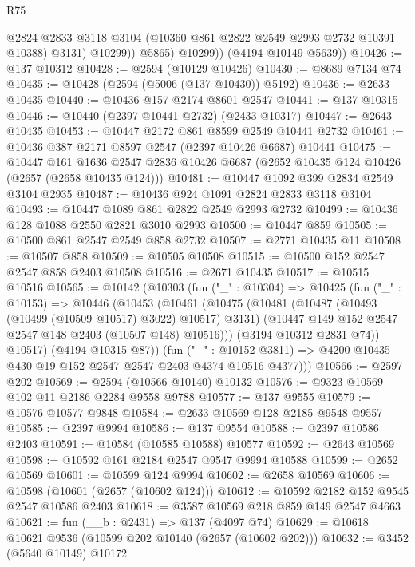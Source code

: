 \begin{lexlean}{R75}
\begin{coremodule}
                  @2824
                  @2833
                  @3118
                  @3104
                  (@10360 @861 @2822 @2549 @2993 @2732 @10391 @10388)
                  @3131)
                @10299))
            @5865)
          @10299))
      (@4194 @10149 @5639))
@10426 := @137 @10312
@10428 := @2594 (@10129 @10426)
@10430 := @8689 @7134 @74
@10435 := @10428 (@2594 (@5006 (@137 @10430)) @5192)
@10436 := @2633 @10435
@10440 := @10436 @157 @2174 @8601 @2547
@10441 := @137 @10315
@10446 := @10440 (@2397 @10441 @2732) (@2433 @10317)
@10447 := @2643 @10435
@10453 := @10447 @2172 @861 @8599 @2549 @10441 @2732
@10461 := @10436 @387 @2171 @8597 @2547 (@2397 @10426 @6687) @10441
@10475 := @10447
    @161
    @1636
    @2547
    @2836
    @10426
    @6687
    (@2652 @10435 @124 @10426 (@2657 (@2658 @10435 @124)))
@10481 := @10447 @1092 @399 @2834 @2549 @3104 @2935
@10487 := @10436 @924 @1091 @2824 @2833 @3118 @3104
@10493 := @10447 @1089 @861 @2822 @2549 @2993 @2732
@10499 := @10436 @128 @1088 @2550 @2821 @3010 @2993
@10500 := @10447 @859
@10505 := @10500 @861 @2547 @2549 @858 @2732
@10507 := @2771 @10435 @11
@10508 := @10507 @858
@10509 := @10505 @10508
@10515 := @10500 @152 @2547 @2547 @858 @2403 @10508
@10516 := @2671 @10435
@10517 := @10515 @10516
@10565 := @10142
    (@10303
      (fun ("_" : @10304) =>
      @10425
        (fun ("_" : @10153) =>
        @10446
          (@10453
            (@10461
              (@10475
                (@10481
                  (@10487 (@10493 (@10499 (@10509 @10517) @3022) @10517) @3131)
                  (@10447 @149 @152 @2547 @2547 @148 @2403 (@10507 @148) @10516)))
              (@3194 @10312 @2831 @74))
            @10517)
          (@4194 @10315 @87))
        (fun ("_" : @10152 @3811) =>
        @4200 @10435 @430 @19 @152 @2547 @2547 @2403 @4374 @10516 @4377)))
@10566 := @2597 @202
@10569 := @2594 (@10566 @10140) @10132
@10576 := @9323 @10569 @102 @11 @2186 @2284 @9558 @9788
@10577 := @137 @9555
@10579 := @10576 @10577 @9848
@10584 := @2633 @10569 @128 @2185 @9548 @9557
@10585 := @2397 @9994
@10586 := @137 @9554
@10588 := @2397 @10586 @2403
@10591 := @10584 (@10585 @10588) @10577
@10592 := @2643 @10569
@10598 := @10592 @161 @2184 @2547 @9547 @9994 @10588
@10599 := @2652 @10569
@10601 := @10599 @124 @9994
@10602 := @2658 @10569
@10606 := @10598 (@10601 (@2657 (@10602 @124)))
@10612 := @10592 @2182 @152 @9545 @2547 @10586 @2403
@10618 := @3587 @10569 @218 @859 @149 @2547 @4663
@10621 := fun (__b : @2431) => @137 (@4097 @74)
@10629 := @10618 @10621 @9536 (@10599 @202 @10140 (@2657 (@10602 @202)))
@10632 := @3452 (@5640 @10149) @10172

\end{coremodule}
\end{lexlean}
